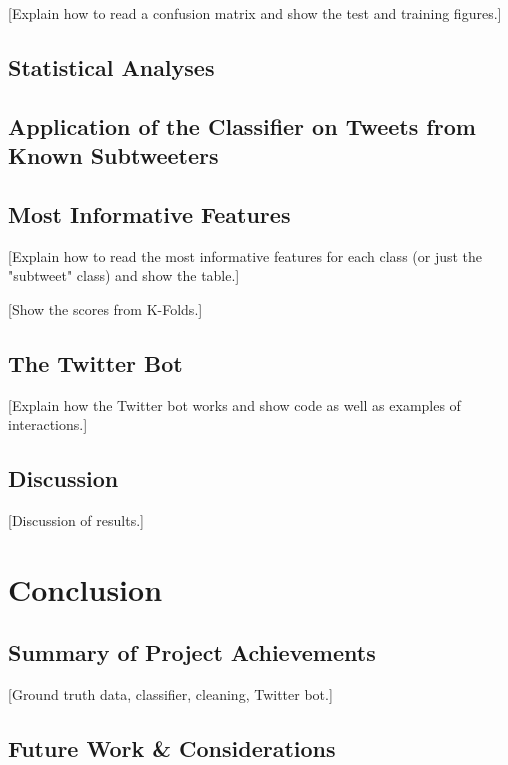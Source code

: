 \documentclass[11pt, twoside, reqno]{book}
\begin{document}
[Explain how to read a confusion matrix and show the test and training figures.]

\section{Statistical Analyses}
\label{statistical_analyses}

\section{Application of the Classifier on Tweets from Known Subtweeters}
\label{known_subtweeters_analysis}

\section{Most Informative Features}
\label{most_informative_features}

[Explain how to read the most informative features for each class (or just the "subtweet" class) and show the table.]

[Show the scores from K-Folds.]

\section{The Twitter Bot}
\label{the_twitter_bot}

[Explain how the Twitter bot works and show code as well as examples of interactions.]

\section{Discussion}
\label{discussion}

[Discussion of results.]

\chapter{Conclusion}
\label{conclusion}

\section{Summary of Project Achievements}
\label{summary}

[Ground truth data, classifier, cleaning, Twitter bot.]

\section{Future Work \& Considerations}
\label{future_work_and_considerations}
\end{document}
